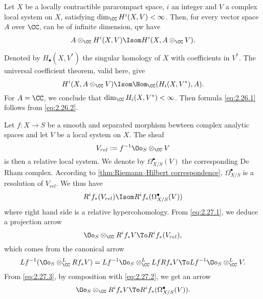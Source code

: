 \begin{recall}\label{recall:projection}
  Let $X$ be a locally contractible paracompact space, $i$ an integer and $V$ a
  complex local system on $X$, satisfying $\dim_{\CC}H^i(X,V)<\infty$. Then,
  for every vector space $A$ over $\CC$, can be of infinite dimension, qw have
  \begin{equation}\label{eq:2.26.1}
    A\otimes_{\CC}H^i(X,V) \Isom H^i(X,A\otimes_{\CC}V).
  \end{equation}
\end{recall}

Denoted by $H_\bullet(X,V^\ast)$ the singular homology of $X$ with coefficients
in $V^\ast$. The universal coefficient theorem, valid here, give
\begin{equation}\label{eq:2.26.2}
  H^i(X,A\otimes_{\CC}V) \Isom \Hom_{\CC}(H_i(X,V^{\ast}),A).
\end{equation}
For $A=\CC$, we conclude that $\dim_{\CC} H_i(X,V^{\ast})<\infty$.
Then formula \cref{eq:2.26.1} follows from \cref{eq:2.26.2}.

\begin{para}\label{recall:2.27}
  Let $f\colon X\to S$ be a smooth and separated morphism bewteen complex
  analytic spaces and let $V$ be a local system on $X$. The sheaf
  \begin{equation}\label{eq:2.27.1}
    V_{rel}:=f^{-1}\Oo_S\otimes_{\CC}V
  \end{equation}
  is then a relative local system. We denote by $\Omega_{X/S}^\bullet(V)$ the
  corresponding De Rham complex.
  According to \ref{thm:Riemann–Hilbert correspondence}, $\Omega_{X/S}^\bullet$
  is a resolution of $V_{rel}$. We thus have
  \begin{equation}\label{eq:2.27.2}
    R^if_{\ast}(V_{rel}) \Isom R^if_{\ast}(\Omega_{X/S}^\bullet(V))
  \end{equation}
  where right hand side is a relative hypercohomology. From \cref{eq:2.27.1},
  we deduce a projection arrow
  \begin{equation}\label{eq:2.27.3}
    \Oo_S\otimes_{\CC}R^if_{\ast}V\To R^if_{\ast}(V_{rel}),
  \end{equation}
  which comes from the canonical arrow
  \[
  Lf^{-1}(\Oo_S\otimes^L_{\CC}Rf_{\ast}V)=
  Lf^{-1}\Oo_S\otimes^L_{\CC}LfRf_{\ast}V\To
  Lf^{-1}\Oo_S\otimes^L_{\CC}V.
  \]
  From \cref{eq:2.27.3}, by composition with \cref{eq:2.27.2}, we get an arrow
  \begin{equation}\label{eq:2.27.4}
    \Oo_S\otimes_{\CC}R^if_{\ast}V\To R^if_{\ast}(\Omega_{X/S}^\bullet(V)).
  \end{equation}
\end{para}


